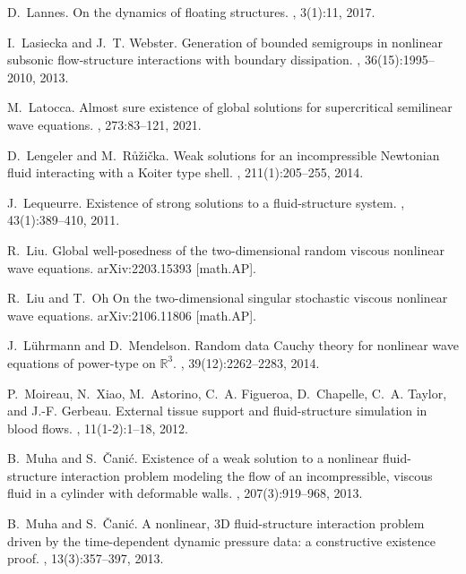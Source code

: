 \documentclass[letterpaper, 11pt,  reqno]{amsart}
\newcommand{\1}{\hspace{0.5mm}\text{I}\hspace{0.2mm}}
\numberwithin{equation}{section}
\numberwithin{theorem}{section}
\begin{document}
\begin{thebibliography}{10}
D.~Lannes.
\newblock On the dynamics of floating structures.
, 3(1):11, 2017.

I.~Lasiecka and J.~T. Webster.
\newblock Generation of bounded semigroups in nonlinear subsonic flow-structure interactions with boundary dissipation.
, 36(15):1995--2010, 2013.

M.~Latocca.
\newblock Almost sure existence of global solutions for supercritical
  semilinear wave equations.
, 273:83--121, 2021.

D.~Lengeler and M.~R{\r u}{\v z}i{\v c}ka.
\newblock Weak solutions for an incompressible {N}ewtonian fluid interacting
  with a {K}oiter type shell.
, 211(1):205--255, 2014.

J.~Lequeurre.
\newblock Existence of strong solutions to a fluid-structure system.
, 43(1):389--410, 2011.

R.~Liu.
\newblock Global well-posedness of the two-dimensional random viscous nonlinear wave equations.
arXiv:2203.15393 [math.AP].

R.~Liu and T.~Oh
\newblock On the two-dimensional singular stochastic viscous nonlinear wave equations.
arXiv:2106.11806 [math.AP].

J.~L\"{u}hrmann and D.~Mendelson.
\newblock Random data {C}auchy theory for nonlinear wave equations of
  power-type on $\mathbb{R}^{3}$.
, 39(12):2262--2283, 2014.

P.~Moireau, N.~Xiao, M.~Astorino, C.~A. Figueroa, D.~Chapelle, C.~A. Taylor,
  and J.-F. Gerbeau.
\newblock External tissue support and fluid-structure simulation in blood
  flows.
, 11(1-2):1--18, 2012.

B.~Muha and S.~{\v C}ani\'c.
\newblock Existence of a weak solution to a nonlinear fluid-structure
  interaction problem modeling the flow of an incompressible, viscous fluid in
  a cylinder with deformable walls.
, 207(3):919--968, 2013.

B.~Muha and S.~{\v C}ani\'c.
\newblock A nonlinear, 3{D} fluid-structure interaction problem driven by the
  time-dependent dynamic pressure data: a constructive existence proof.
, 13(3):357--397, 2013.


\end{thebibliography}
\end{document}
